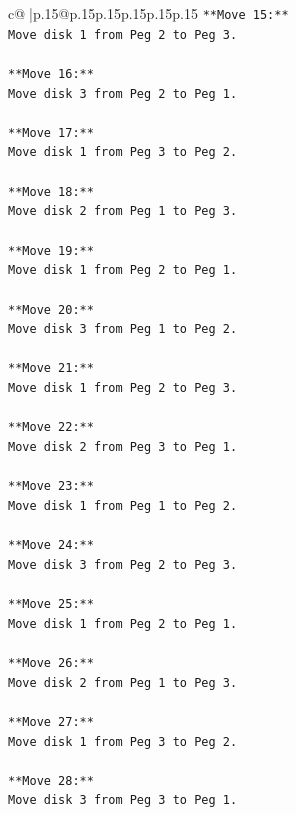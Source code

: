 \documentclass{article}
\begin{document}
{\begin{supertabular}{c@{$\;$}|p{.15\linewidth}@{}p{.15\linewidth}p{.15\linewidth}p{.15\linewidth}p{.15\linewidth}p{.15\linewidth}}
{{{\texttt{**Move 15:**} \\
\texttt{Move disk 1 from Peg 2 to Peg 3.} \\
\\ 
\texttt{**Move 16:**} \\
\texttt{Move disk 3 from Peg 2 to Peg 1.} \\
\\ 
\texttt{**Move 17:**} \\
\texttt{Move disk 1 from Peg 3 to Peg 2.} \\
\\ 
\texttt{**Move 18:**} \\
\texttt{Move disk 2 from Peg 1 to Peg 3.} \\
\\ 
\texttt{**Move 19:**} \\
\texttt{Move disk 1 from Peg 2 to Peg 1.} \\
\\ 
\texttt{**Move 20:**} \\
\texttt{Move disk 3 from Peg 1 to Peg 2.} \\
\\ 
\texttt{**Move 21:**} \\
\texttt{Move disk 1 from Peg 2 to Peg 3.} \\
\\ 
\texttt{**Move 22:**} \\
\texttt{Move disk 2 from Peg 3 to Peg 1.} \\
\\ 
\texttt{**Move 23:**} \\
\texttt{Move disk 1 from Peg 1 to Peg 2.} \\
\\ 
\texttt{**Move 24:**} \\
\texttt{Move disk 3 from Peg 2 to Peg 3.} \\
\\ 
\texttt{**Move 25:**} \\
\texttt{Move disk 1 from Peg 2 to Peg 1.} \\
\\ 
\texttt{**Move 26:**} \\
\texttt{Move disk 2 from Peg 1 to Peg 3.} \\
\\ 
\texttt{**Move 27:**} \\
\texttt{Move disk 1 from Peg 3 to Peg 2.} \\
\\ 
\texttt{**Move 28:**} \\
\texttt{Move disk 3 from Peg 3 to Peg 1.} \\
}}}
\end{supertabular}}
\end{document}
